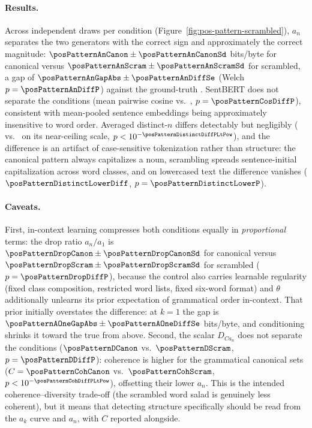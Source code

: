 \paragraph{Results.}
Across \posPatternNDraws{} independent draws per condition (Figure~\ref{fig:pos-pattern-scrambled}), $a_n$ separates the two generators with the correct sign and approximately the correct magnitude: $\posPatternAnCanon \pm \posPatternAnCanonSd$ bits/byte for canonical versus $\posPatternAnScram \pm \posPatternAnScramSd$ for scrambled, a gap of $\posPatternAnGapAbs \pm \posPatternAnDiffSe$ (Welch $p = \posPatternAnDiffP$) against the ground-truth \posPatternOrderBitsPerByte.
SentBERT does not separate the conditions (mean pairwise cosine \posPatternCosCanon{} vs.\ \posPatternCosScram, $p = \posPatternCosDiffP$), consistent with mean-pooled sentence embeddings being approximately insensitive to word order.
Averaged distinct-$n$ differs detectably but negligibly (\posPatternDistinctCanon{} vs.\ \posPatternDistinctScram{} on its near-ceiling scale, $p < 10^{-\posPatternDistinctDiffPLtPow}$), and the difference is an artifact of case-sensitive tokenization rather than structure: the canonical pattern always capitalizes a noun, scrambling spreads sentence-initial capitalization across word classes, and on lowercased text the difference vanishes ($\posPatternDistinctLowerDiff$, $p = \posPatternDistinctLowerP$).

\paragraph{Caveats.}
First, in-context learning compresses both conditions equally in \emph{proportional} terms: the drop ratio $a_n/a_1$ is $\posPatternDropCanon \pm \posPatternDropCanonSd$ for canonical versus $\posPatternDropScram \pm \posPatternDropScramSd$ for scrambled ($p = \posPatternDropDiffP$), because the control also carries learnable regularity (fixed class composition, restricted word lists, fixed six-word format) and $\theta$ additionally unlearns its prior expectation of grammatical order in-context.
That prior initially overstates the difference: at $k=1$ the gap is $\posPatternAOneGapAbs \pm \posPatternAOneDiffSe$ bits/byte, and conditioning shrinks it toward the true \posPatternOrderBitsPerByte{} from above.
Second, the scalar $D_{Ca_n}$ does not separate the conditions ($\posPatternDCanon$ vs.\ $\posPatternDScram$, $p = \posPatternDDiffP$): coherence is higher for the grammatical canonical sets ($C = \posPatternCohCanon$ vs.\ $\posPatternCohScram$, $p < 10^{-\posPatternCohDiffPLtPow}$), offsetting their lower $a_n$.
This is the intended coherence--diversity trade-off (the scrambled word salad is genuinely less coherent), but it means that detecting structure specifically should be read from the $a_k$ curve and $a_n$, with $C$ reported alongside.
